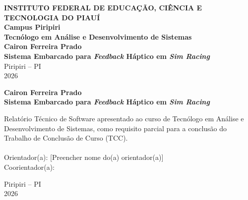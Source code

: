 \documentclass[12pt,oneside,a4paper]{article}
\newcommand{\Instituicao}{INSTITUTO FEDERAL DE EDUCAÇÃO, CIÊNCIA E TECNOLOGIA DO PIAUÍ}
\newcommand{\Campus}{Campus Piripiri}
\newcommand{\Curso}{Tecnólogo em Análise e Desenvolvimento de Sistemas}
\newcommand{\Titulo}{Sistema Embarcado para \textit{Feedback} Háptico em \textit{Sim Racing}}
\newcommand{\Autor}{Cairon Ferreira Prado}
\newcommand{\Orientador}{[Preencher nome do(a) orientador(a)]}
\newcommand{\CoOrientador}{}
\newcommand{\Cidade}{Piripiri -- PI}
\newcommand{\Ano}{2026}
\begin{document}
\begin{titlepage}
\begin{center}
\textbf{\Instituicao} \\
\textbf{\Campus} \\
\textbf{\Curso} \\[3cm]

\textbf{\Autor} \\[2.5cm]
\textbf{\Titulo} \\[6cm]

\Cidade\\
\Ano
\end{center}
\end{titlepage}

\begin{titlepage}
\begin{center}
\textbf{\Autor} \\[3cm]

\textbf{\Titulo} \\[2cm]

\begin{flushright}
\begin{minipage}{0.6\textwidth}
Relatório Técnico de Software apresentado ao curso de \Curso{}, como requisito parcial para a conclusão do Trabalho de Conclusão de Curso (TCC). \\ \\
Orientador(a): \Orientador
\ifx\CoOrientador\empty\else \\ Coorientador(a): \CoOrientador \fi
\end{minipage}
\end{flushright}

\vfill
\Cidade \\
\Ano
\end{center}
\end{titlepage}

\newpage
\end{document}
